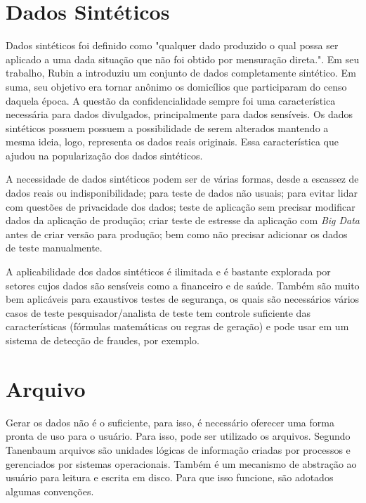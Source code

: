 \documentclass[
	12pt,				%
	openright,			%
	twoside,			%
	a4paper,			%
	english,			%
	brazil				%
	]{abntex2}
\begin{document}
	\section{Dados Sintéticos}
		Dados sintéticos foi definido como "qualquer dado produzido o qual possa ser aplicado a uma dada situação que não foi obtido por mensuração direta.". \cite{mcgraw-hilleducation2016}
		Em seu trabalho, Rubin \cite{rubin1993statistical} a introduziu um conjunto de dados completamente sintético.
		Em suma, seu objetivo era tornar anônimo os domicílios que participaram do censo daquela época.
		A questão da confidencialidade sempre foi uma característica necessária para dados divulgados, principalmente para dados sensíveis.
		Os dados sintéticos possuem possuem a possibilidade de serem alterados mantendo a mesma ideia, logo, representa os dados reais originais.
		Essa característica que ajudou na popularização dos dados sintéticos.
		\par
		A necessidade de dados sintéticos podem ser de várias formas, 
		desde a escassez de dados reais ou indisponibilidade;
		para teste de dados não usuais;
		para evitar lidar com questões de privacidade dos dados;
		teste de aplicação sem precisar modificar dados da aplicação de produção;
		criar teste de estresse da aplicação com \emph{Big Data} antes de criar versão para produção;
		bem como não precisar adicionar os dados de teste manualmente. \cite{top15DatagenTools2019}
		\par
		A aplicabilidade dos dados sintéticos é ilimitada e é bastante explorada por setores cujos dados são sensíveis como a financeiro \cite{lopez2012money} e de saúde. \cite{bergeat2014french} 	
		Também são muito bem aplicáveis para exaustivos testes de segurança, os quais são necessários vários casos de teste
		pesquisador/analista de teste tem controle suficiente das características (fórmulas matemáticas ou regras de geração) e pode usar em um sistema de detecção de fraudes, por exemplo. \cite{barse2003synthesizing}
		
	
	\section{Arquivo}
		Gerar os dados não é o suficiente, para isso, é necessário oferecer uma forma pronta de uso para o usuário.
		Para isso, pode ser utilizado os arquivos.
		Segundo Tanenbaum \cite{tanenbaum1995sistemas} arquivos são unidades lógicas de informação criadas por processos e gerenciados por sistemas operacionais.
		Também é um mecanismo de abstração ao usuário para leitura e escrita em disco.
		Para que isso funcione, são adotados algumas convenções.
		\par
\end{document}
